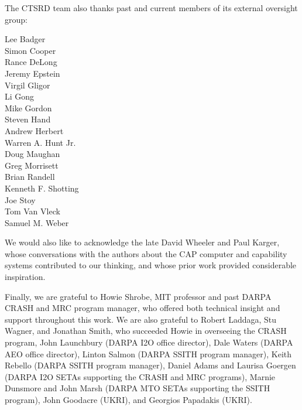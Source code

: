 \medskip

\noindent
The CTSRD team also thanks past and current members of its external oversight
group:

\medskip

\begin{small}
\noindent\begin{autogrid}{5}
Lee Badger \\
Simon Cooper \\
Rance DeLong \\
Jeremy Epstein \\
Virgil Gligor \\
Li Gong \\
Mike Gordon \\
Steven Hand \\
Andrew Herbert \\
Warren A. Hunt Jr. \\
Doug Maughan \\
Greg Morrisett \\
Brian Randell \\
Kenneth F. Shotting \\
Joe Stoy \\
Tom Van Vleck \\
Samuel M. Weber \\
\end{autogrid}
\end{small}

\medskip

\noindent
We would also like to acknowledge the late David Wheeler and Paul Karger,
whose conversations with the authors about the CAP computer and capability
systems contributed to our thinking, and whose prior work provided
considerable inspiration.

\medskip

\noindent
Finally, we are grateful to Howie Shrobe, MIT professor and past DARPA CRASH
and MRC program manager, who offered both technical insight and support
throughout this work.  We are also grateful to Robert Laddaga, Stu Wagner, and
Jonathan Smith, who succeeded Howie in overseeing the CRASH program, John
Launchbury (DARPA I2O office director), Dale Waters (DARPA AEO office
director), Linton Salmon (DARPA SSITH program manager), Keith Rebello (DARPA
SSITH program manager), Daniel Adams and
Laurisa Goergen (DARPA I2O SETAs supporting the CRASH and MRC programs),
Marnie Dunsmore and John Marsh (DARPA MTO SETAs supporting the SSITH
program), John Goodacre (UKRI), and Georgios Papadakis (UKRI).
